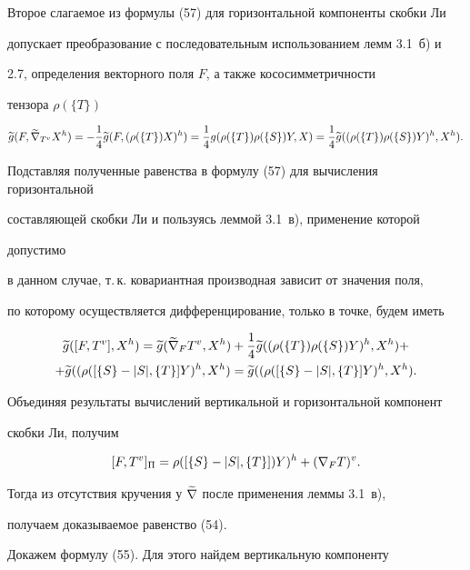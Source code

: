 Второе слагаемое из формулы (57) для горизонтальной компоненты скобки Ли


допускает преобразование с последовательным использованием лемм 3.1~б) и


2.7, определения векторного поля $F$, а также кососимметричности


тензора $\rho(\{T\})$


$$


\g{g}(F,\grn{\gv{T}}{\gh{X}})=-\4\g{g}(F,\gh{(\rho(\{T\})X)})=


\4 g(\rho(\{T\})\rho(\{S\})Y,X)=


\4 \g{g}(\gh{(\rho(\{T\})\rho(\{S\})Y)},\gh{X}).


$$


Подставляя полученные равенства в формулу (57) для вычисления горизонтальной


составляющей скобки Ли и пользуясь леммой 3.1~в), применение которой 


допустимо


в данном случае, т.\,к. ковариантная производная зависит от значения поля,


по которому осуществляется дифференцирование, только в точке, будем иметь


\begin{multline*}


\g{g}([F,\gv{T}],\gh{X})=\g{g}(\grn{F}{\gv{T}},\gh{X})+


\4 \g{g}(\gh{(\rho(\{T\})\rho(\{ S\})Y)},\gh{X})+\\


+\g{g}(\gh{(\rho([\{S\}-|S|,\{T\}]Y)},\gh{X})=


\g{g}(\gh{(\rho([\{S\}-|S|,\{T\}]Y)},\gh{X}).


\end{multline*}


Объединяя результаты вычислений вертикальной и горизонтальной компонент


скобки Ли, получим


$$


[F,\gv{T}]_\Pi=\gh{\rho([\{S\}-|S|,\{T\}])Y)}+\gv{(\n{F}{T})}.


$$


Тогда из отсутствия кручения у $\widetilde {\nabla}$ после применения леммы 3.1~в),


получаем доказываемое равенство (54).





Докажем формулу (55). Для этого найдем вертикальную компоненту


